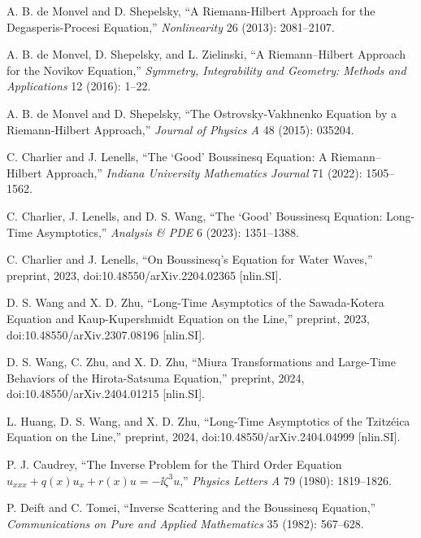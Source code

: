 \begin{enumerate}[label={[\arabic*]},leftmargin=2.8em]
\item A. B. de Monvel and D. Shepelsky, ``A Riemann-Hilbert Approach for the Degasperis-Procesi Equation,'' \emph{Nonlinearity} 26 (2013): 2081--2107.
\item A. B. de Monvel, D. Shepelsky, and L. Zielinski, ``A Riemann--Hilbert Approach for the Novikov Equation,'' \emph{Symmetry, Integrability and Geometry: Methods and Applications} 12 (2016): 1--22.
\item A. B. de Monvel and D. Shepelsky, ``The Ostrovsky-Vakhnenko Equation by a Riemann-Hilbert Approach,'' \emph{Journal of Physics A} 48 (2015): 035204.
\item C. Charlier and J. Lenells, ``The `Good' Boussinesq Equation: A Riemann--Hilbert Approach,'' \emph{Indiana University Mathematics Journal} 71 (2022): 1505--1562.
\item C. Charlier, J. Lenells, and D. S. Wang, ``The `Good' Boussinesq Equation: Long-Time Asymptotics,'' \emph{Analysis \& PDE} 6 (2023): 1351--1388.
\item C. Charlier and J. Lenells, ``On Boussinesq's Equation for Water Waves,'' preprint, 2023, doi:10.48550/arXiv.2204.02365 [nlin.SI].
\item D. S. Wang and X. D. Zhu, ``Long-Time Asymptotics of the Sawada-Kotera Equation and Kaup-Kupershmidt Equation on the Line,'' preprint, 2023, doi:10.48550/arXiv.2307.08196 [nlin.SI].
\item D. S. Wang, C. Zhu, and X. D. Zhu, ``Miura Transformations and Large-Time Behaviors of the Hirota-Satsuma Equation,'' preprint, 2024, doi:10.48550/arXiv.2404.01215 [nlin.SI].
\item L. Huang, D. S. Wang, and X. D. Zhu, ``Long-Time Asymptotics of the Tzitzéica Equation on the Line,'' preprint, 2024, doi:10.48550/arXiv.2404.04999 [nlin.SI].
\item P. J. Caudrey, ``The Inverse Problem for the Third Order Equation $u_{xxx}+q(x)u_x+r(x)u=-\ii\zeta^3u$,'' \emph{Physics Letters A} 79 (1980): 1819--1826.
\item P. Deift and C. Tomei, ``Inverse Scattering and the Boussinesq Equation,'' \emph{Communications on Pure and Applied Mathematics} 35 (1982): 567--628.

\end{enumerate}
